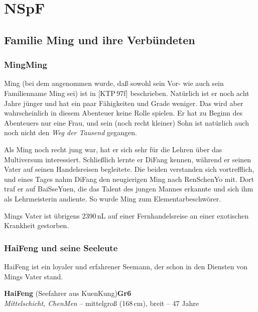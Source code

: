 \documentclass[
a4paper,
twoside,
DIV=calc,
BCOR=4mm,
fontsize=9pt,
twocolumn=on,
titlepage=on,
parskip=half
]{scrartcl}
\begin{document}
\section{NSpF}

\subsection{Familie Ming und ihre Verbündeten}

\subsubsection{MingMing}

Ming (bei dem angenommen wurde, daß sowohl sein Vor- wie auch sein
Familienname Ming sei) ist in [KTP\,97f] beschrieben. Natürlich ist er
noch acht Jahre jünger und hat ein paar Fähigkeiten und Grade
weniger. Das wird aber wahrscheinlich in diesem Abenteuer keine Rolle
spielen. Er hat zu Beginn des Abenteuers nur eine Frau, und sein (noch
recht kleiner) Sohn ist natürlich auch noch nicht den \emph{Weg der
  Tausend} gegangen.

Als Ming noch recht jung war, hat er sich sehr für die Lehren über das
Multiversum interessiert. Schließlich lernte er DiFang kennen, während
er seinen Vater auf seinen Handelsreisen begleitete. Die beiden
verstanden sich vortrefflich, und eines Tages nahm DiFang den
neugierigen Ming nach RenSchenYo mit. Dort traf er auf BaiSseYuen, die
das Talent des jungen Mannes erkannte und sich ihm als Lehrmeisterin
andiente. So wurde Ming zum Elementarbeschwörer.

Mings Vater ist übrigens 2390\,nL auf einer Fernhandelsreise an einer
exotischen Krankheit gestorben.

\subsubsection{HaiFeng und seine Seeleute}

HaiFeng ist ein loyaler und erfahrener Seemann, der schon in den
Diensten von Mings Vater stand.

\textbf{HaiFeng} (Seefahrer aus KuenKung)\hfill \textbf{Gr6}\\
{\small\emph{Mittelschicht, ChenMen} -- mittelgroß (168\,cm), breit -- 47 Jahre}

\end{document}
